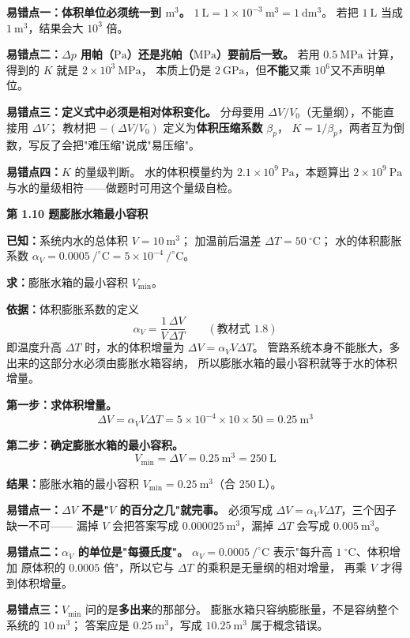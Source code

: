 \begin{yicuo}
\textbf{易错点一：体积单位必须统一到 $\mathrm{m^3}$。}
$1\ \mathrm{L}=1\times10^{-3}\ \mathrm{m^3}=1\ \mathrm{dm^3}$。
若把 $1\ \mathrm{L}$ 当成 $1\ \mathrm{m^3}$，结果会大 $10^{3}$ 倍。

\textbf{易错点二：$\Delta p$ 用帕（$\mathrm{Pa}$）还是兆帕（$\mathrm{MPa}$）要前后一致。}
若用 $0.5\ \mathrm{MPa}$ 计算，得到的 $K$ 就是 $2\times10^{3}\ \mathrm{MPa}$，
本质上仍是 $2\ \mathrm{GPa}$，但\textbf{不能}又乘 $10^{6}$又不声明单位。

\textbf{易错点三：定义式中必须是\textbf{相对}体积变化。}
分母要用 $\Delta V/V_0$（无量纲），不能直接用 $\Delta V$；
教材把 $-(\Delta V/V_0)$ 定义为\textbf{体积压缩系数} $\beta_p$，
$K=1/\beta_p$，两者互为倒数，写反了会把"难压缩"说成"易压缩"。

\textbf{易错点四：}$K$ 的量级判断。
水的体积模量约为 $2.1\times10^{9}\ \mathrm{Pa}$，本题算出 $2\times10^{9}\ \mathrm{Pa}$
与水的量级相符——做题时可用这个量级自检。
\end{yicuo}

\noindent\textbf{第 1.10 题\quad 膨胀水箱最小容积}

\begin{jie}
\textbf{已知：}系统内水的总体积 $V=10\ \mathrm{m^3}$；
加温前后温差 $\Delta T=50\ ^{\circ}\mathrm{C}$；
水的体积膨胀系数 $\alpha_V=0.0005\ /^{\circ}\mathrm{C}=5\times10^{-4}\ /^{\circ}\mathrm{C}$。

\textbf{求：}膨胀水箱的最小容积 $V_{\min}$。

\textbf{依据：}体积膨胀系数的定义
\[ \alpha_V=\frac{1}{V}\frac{\Delta V}{\Delta T}
   \qquad(\text{教材式 1.8}) \]
即温度升高 $\Delta T$ 时，水的体积增量为 $\Delta V=\alpha_V V\Delta T$。
管路系统本身不能胀大，多出来的这部分水必须由膨胀水箱容纳，
所以膨胀水箱的最小容积就等于水的体积增量。

\textbf{第一步：求体积增量。}
\[ \Delta V=\alpha_V V\Delta T=5\times10^{-4}\times10\times50
   =0.25\ \mathrm{m^3} \]

\textbf{第二步：确定膨胀水箱的最小容积。}
\[ V_{\min}=\Delta V=0.25\ \mathrm{m^3}=250\ \mathrm{L} \]

\textbf{结果：}膨胀水箱的最小容积 $V_{\min}=0.25\ \mathrm{m^3}$（合 $250\ \mathrm{L}$）。
\end{jie}

\begin{yicuo}
\textbf{易错点一：$\Delta V$ 不是"$V$ 的百分之几"就完事。}
必须写成 $\Delta V=\alpha_V V\Delta T$，三个因子缺一不可——
漏掉 $V$ 会把答案写成 $0.000025\ \mathrm{m^3}$，漏掉 $\Delta T$ 会写成 $0.005\ \mathrm{m^3}$。

\textbf{易错点二：$\alpha_V$ 的单位是"每摄氏度"。}
$\alpha_V=0.0005\ /^{\circ}\mathrm{C}$ 表示"每升高 $1\ ^{\circ}\mathrm{C}$、体积增加
原体积的 $0.0005$ 倍"，所以它与 $\Delta T$ 的乘积是无量纲的相对增量，
再乘 $V$ 才得到体积增量。

\textbf{易错点三：}$V_{\min}$ 问的是\textbf{多出来}的那部分。
膨胀水箱只容纳膨胀量，不是容纳整个系统的 $10\ \mathrm{m^3}$；
答案应是 $0.25\ \mathrm{m^3}$，写成 $10.25\ \mathrm{m^3}$ 属于概念错误。
\end{yicuo}

